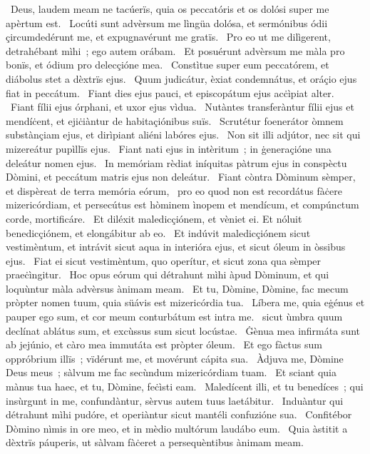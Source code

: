 ~Deus, laudem meam ne tacúerïs, quia os peccatóris et os dolósi super me apèrtum est. 
~Locúti sunt advèrsum me lìngüa dolósa, et sermónibus ódii çircumdedérunt me, et expugnavérunt me gratïs. 
~Pro eo ut me dilìgerent, detrahébant mìhi~; ego autem orábam. 
~Et posuérunt advèrsum me màla pro bonïs, et ódium pro delecçióne mea. 
~Constìtue super eum peccatórem, et diábolus stet a dèxtrïs ejus. 
~Quum judicátur, èxiat condemnátus, et oráçio ejus fiat in peccátum. 
~Fiant dies ejus pauci, et episcopátum ejus acċìpiat alter. 
~Fiant fílii ejus órphani, et uxor ejus vìdua. 
~Nutàntes transferàntur fílii ejus et mendíċent, et ejiċiàntur de habitaçiónibus suïs. 
~Scrutétur foenerátor òmnem substànçiam ejus, et dirìpiant aliéni labóres ejus. 
~Non sit illi adjútor, nec sit qui mizereátur pupìllïs ejus. 
~Fiant nati ejus in intèritum~; in ġeneraçióne una deleátur nomen ejus. 
~In memóriam rèdiat iníquitas pàtrum ejus in conspèctu Dòmini, et peccátum matris ejus non deleátur. 
~Fiant còntra Dòminum sèmper, et dispèreat de terra memória eórum, 
~pro eo quod non est recordátus fàċere mizericórdiam, et persecútus est hòminem ìnopem et mendícum, et compúnctum corde, mortificáre. 
~Et diléxit maledicçiónem, et vèniet ei. Et nóluit benedicçiónem, et elongábitur ab eo. 
~Et indúvit maledicçiónem sicut vestimèntum, et intrávit sicut aqua in interióra ejus, et sicut óleum in òssibus ejus. 
~Fiat ei sicut vestimèntum, quo operítur, et sicut zona qua sèmper praeċìngitur. 
~Hoc opus eórum qui détrahunt mìhi àpud Dòminum, et qui loquùntur màla advèrsus ànimam meam. 
~Et tu, Dòmine, Dòmine, fac mecum pròpter nomen tuum, quia süávis est mizericórdia tua. 
~Líbera me, quia eġénus et pauper ego sum, et cor meum conturbátum est intra me. 
~sicut ùmbra quum declínat ablátus sum, et excùssus sum sicut locústae. 
~Ġènua mea infirmáta sunt ab jejúnio, et càro mea immutáta est pròpter óleum. 
~Et ego fàctus sum oppróbrium illïs~; vïdérunt me, et movérunt cápita sua. 
~Àdjuva me, Dòmine Deus meus~; sàlvum me fac secùndum mizericórdiam tuam. 
~Et sciant quia mànus tua haec, et tu, Dòmine, feċìsti eam. 
~Maledícent illi, et tu benedíces~; qui insùrgunt in me, confundàntur, sèrvus autem tuus laetábitur. 
~Induàntur qui détrahunt mìhi pudóre, et operiàntur sicut mantéli confuzióne sua. 
~Confitébor Dòmino nìmis in ore meo, et in mèdio multórum laudábo eum. 
~Quia àstitit a dèxtrïs páuperis, ut sàlvam fàċeret a persequèntibus ànimam meam. 
